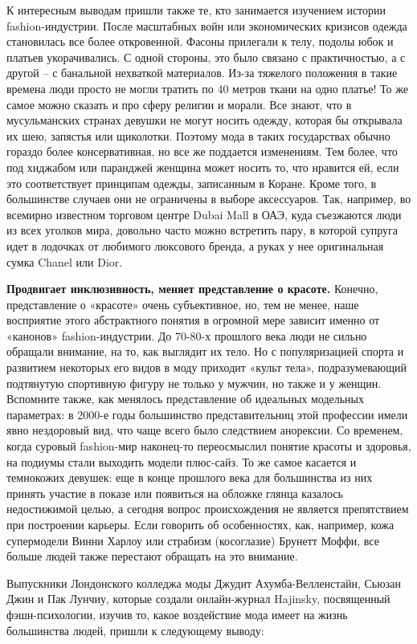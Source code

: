 К интересным выводам пришли также те, кто занимается изучением истории fashion-индустрии. После масштабных войн или экономических кризисов одежда становилась все более откровенной. Фасоны прилегали к телу, подолы юбок и платьев укорачивались. С одной стороны, это было связано с практичностью, а с другой – с банальной нехваткой материалов. Из-за тяжелого положения в такие времена люди просто не могли тратить по 40 метров ткани на одно платье!
То же самое можно сказать и про сферу религии и морали. Все знают, что в мусульманских странах девушки не могут носить одежду, которая бы открывала их шею, запястья или щиколотки. Поэтому мода в таких государствах обычно гораздо более консервативная, но все же поддается изменениям. Тем более, что под хиджабом или паранджей женщина может носить то, что нравится ей, если это соответствует принципам одежды, записанным в Коране. Кроме того, в большинстве случаев они не ограничены в выборе аксессуаров. Так, например, во всемирно известном торговом центре Dubai Mall в ОАЭ, куда съезжаются люди из всех уголков мира, довольно часто можно встретить пару, в которой супруга идет в лодочках от любимого люксового бренда, а руках у нее оригинальная сумка Chanel или Dior.

\textbf{Продвигает инклюзивность, меняет представление о красоте.}
Конечно, представление о «красоте» очень субъективное, но, тем не менее, наше восприятие этого абстрактного понятия в огромной мере зависит именно от «канонов» fashion-индустрии. До 70-80-х прошлого века люди не сильно обращали внимание, на то, как выглядит их тело. Но с популяризацией спорта и развитием некоторых его видов в моду приходит «культ тела», подразумевающий подтянутую спортивную фигуру не только у мужчин, но также и у женщин. Вспомните также, как менялось представление об идеальных модельных параметрах: в 2000-е годы большинство представительниц этой профессии имели явно нездоровый вид, что чаще всего было следствием анорексии. Со временем, когда суровый fashion-мир наконец-то переосмыслил понятие красоты и здоровья, на подиумы стали выходить модели плюс-сайз. То же самое касается и темнокожих девушек: еще в конце прошлого века для большинства из них принять участие в показе или появиться на обложке глянца казалось недостижимой целью, а сегодня вопрос происхождения не является препятствием при построении карьеры. Если говорить об особенностях, как, например, кожа супермодели Винни Харлоу или страбизм (косоглазие) Брунетт Моффи, все больше людей также перестают обращать на это внимание.

Выпускники Лондонского колледжа моды Джудит Ахумба-Велленстайн, Сьюзан Джин и Пак Лунчиу, которые создали онлайн-журнал Hajinsky, посвященный фэшн-психологии, изучив то, какое воздействие мода имеет на жизнь большинства людей, пришли к следующему выводу:

